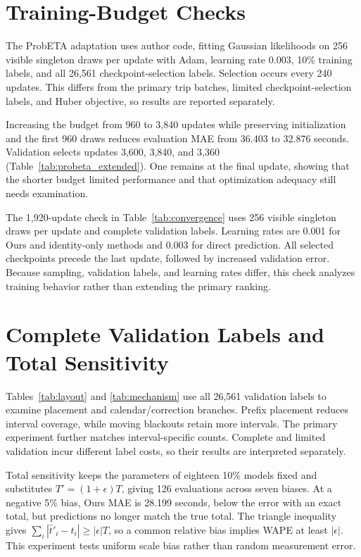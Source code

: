 \documentclass[journal]{IEEEtran}
\begin{document}
\section{Training-Budget Checks}

The ProbETA adaptation uses author code\cite{xu2025probeta}, fitting Gaussian likelihoods on 256 visible singleton draws per update with Adam, learning rate 0.003, 10\% training labels, and all 26,561 checkpoint-selection labels. Selection occurs every 240 updates. This differs from the primary trip batches, limited checkpoint-selection labels, and Huber objective, so results are reported separately.

Increasing the budget from 960 to 3,840 updates while preserving initialization and the first 960 draws reduces evaluation MAE from 36.403 to 32.876 seconds. Validation selects updates 3,600, 3,840, and 3,360 (Table~\ref{tab:probeta_extended}). One remains at the final update, showing that the shorter budget limited performance and that optimization adequacy still needs examination.


The 1,920-update check in Table~\ref{tab:convergence} uses 256 visible singleton draws per update and complete validation labels. Learning rates are 0.001 for Ours and identity-only methods and 0.003 for direct prediction. All selected checkpoints precede the last update, followed by increased validation error. Because sampling, validation labels, and learning rates differ, this check analyzes training behavior rather than extending the primary ranking.

\section{Complete Validation Labels and Total Sensitivity}


Tables~\ref{tab:layout} and \ref{tab:mechanism} use all 26,561 validation labels to examine placement and calendar/correction branches. Prefix placement reduces interval coverage, while moving blackouts retain more intervals. The primary experiment further matches interval-specific counts. Complete and limited validation incur different label costs, so their results are interpreted separately.


Total sensitivity keeps the parameters of eighteen 10\% models fixed and substitutes $T'=(1+\epsilon)T$, giving 126 evaluations across seven biases. At a negative 5\% bias, Ours MAE is 28.199 seconds, below the error with an exact total, but predictions no longer match the true total. The triangle inequality gives $\sum_i|\hat t'_i-t_i|\geq|\epsilon|T$, so a common relative bias implies WAPE at least $|\epsilon|$. This experiment tests uniform scale bias rather than random measurement error.
\end{document}
